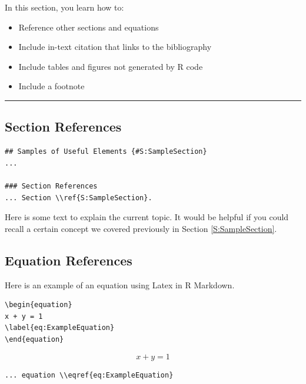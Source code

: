 \documentclass[]{book}
\providecommand{\tightlist}{%
  \setlength{\itemsep}{0pt}\setlength{\parskip}{0pt}}
\theoremstyle{definition}
\theoremstyle{definition}
\theoremstyle{definition}
\theoremstyle{remark}
\begin{document}
In this section, you learn how to:

\begin{itemize}
\tightlist
\item
  Reference other sections and equations
\item
  Include in-text citation that links to the bibliography
\item
  Include tables and figures not generated by R code
\item
  Include a footnote
\end{itemize}

\begin{center}\rule{0.5\linewidth}{\linethickness}\end{center}

\subsection{Section References}\label{section-references}

\begin{verbatim}
## Samples of Useful Elements {#S:SampleSection}
...

### Section References
... Section \\ref{S:SampleSection}.
\end{verbatim}

Here is some text to explain the current topic. It would be helpful if
you could recall a certain concept we covered previously in Section
\ref{S:SampleSection}.

\subsection{Equation References}\label{equation-references}

Here is an example of an equation using Latex in R Markdown.

\begin{verbatim}
\begin{equation}
x + y = 1  
\label{eq:ExampleEquation}
\end{equation}
\end{verbatim}

\begin{equation}
x + y = 1  
\label{eq:ExampleEquation}
\end{equation}

\begin{verbatim}
... equation \\eqref{eq:ExampleEquation}
\end{verbatim}
\end{document}
